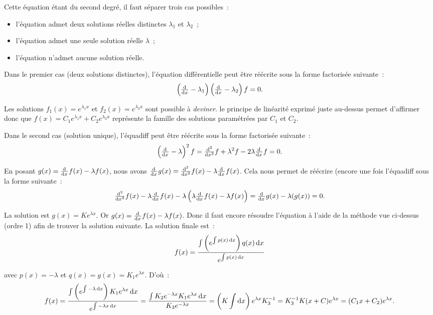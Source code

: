 \documentclass{article}
\theoremstyle{definition}
\theoremstyle{remark}
\begin{document}
			Cette équation étant du second degré, il faut séparer trois cas possibles~:
			\begin{itemize}
				\item l'équation admet deux solutions réelles distinctes $\lambda_1$ et $\lambda_2$~;
				\item l'équation admet une seule solution réelle $\lambda$~;
				\item l'équation n'admet aucune solution réelle.
			\end{itemize}

			Dans le premier cas (deux solutions distinctes), l'équation différentielle peut être réécrite sous la forme factorisée suivante~:
			\[\left(\od{}{x} - \lambda_1\right)\left(\od{}{x} - \lambda_2\right)f = 0.\]

			Les solutions $f_1(x) = e^{\lambda_1 x}$ et $f_2(x) = e^{\lambda_2 x}$ sont possible à \textit{deviner}. le principe de linéarité exprimé juste au-dessus
			permet d'affirmer donc que $f(x) = C_1e^{\lambda_1 x} + C_2e^{\lambda_2 x}$ représente la famille des solutions paramétrées par $C_1$ et $C_2$.

			Dans le second cas (solution unique), l'équadiff peut être réécrite sous la forme factorisée suivante~:
			\[\left(\od{}{x} - \lambda\right)^2f = \od[2]{}{x}f + \lambda^2f - 2\lambda\od{}{x}f = 0.\]

			En posant $g(x) = \od{}{x}f(x) - \lambda f(x)$, nous avons $\od{}{x}g(x) = \od[2]{}{x}f(x) - \lambda\od{}{x}f(x)$. Cela nous permet de réécrire (encore une
			fois l'équadiff sous la forme suivante~:
			\[\od[2]{}{x}f(x) - \lambda\od{}{x}f(x) - \lambda\left(\lambda\od{}{x}f(x) - \lambda f(x)\right) = \od{}{x}g(x) - \lambda(g(x)) = 0.\]

			La solution est $g(x) = Ke^{\lambda x}$. Or $g(x) = \od{}{x}f(x) - \lambda f(x)$. Donc il faut encore résoudre l'équation à l'aide de la méthode vue ci-dessus
			(ordre 1) afin de trouver la solution suivante. La solution finale est~:
			\[f(x) = \frac {\int \left(e^{\int p(x) \dif x}\right) q(x) \dif x}{e^{\int p(x) \dif x}}\]

			avec $p(x) = -\lambda$ et $q(x) = g(x) = K_1e^{\lambda x}$. D'où~:
			\[
				f(x) = \frac {\int \left(e^{\int -\lambda \dif x}\right) K_1e^{\lambda x} \dif x}{e^{\int -\lambda x \dif x}}
				     = \frac {\int K_2e^{-\lambda x}K_1e^{\lambda x} \dif x}{K_3e^{-\lambda x}}
				     = \left(K\int\dif x\right)e^{\lambda x}K_3^{-1} = K_3^{-1}K(x + C)e^{\lambda x} = (C_1x + C_2)e^{\lambda x}.
			\]
\end{document}
